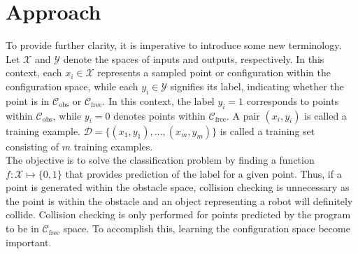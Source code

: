 \documentclass{ctuthesis}
\begin{document}
\section{Approach} 
To provide further clarity, 
it is imperative to introduce some new terminology. 
Let \( \mathcal{X} \) and \( \mathcal{Y} \) denote the spaces of inputs and outputs, 
respectively. 
In this context, 
each \( x_i \in \mathcal{X} \) represents a sampled point or configuration within the configuration space, 
while each \( y_i \in \mathcal{Y} \) signifies its label, 
indicating whether the point is in $\mathcal{C}_{\text{obs}}$ or $\mathcal{C}_{\text{free}}$. 
In this context, 
the label \( y_i = 1 \) corresponds to points within \( \mathcal{C}_{\text{obs}} \), 
while \( y_i = 0 \) denotes points within \( \mathcal{C}_{\text{free}} \).
A pair \( ( x_i, y_i) \) is called a training example. 
\( \mathcal{D} = \{(x_1, y_1), \ldots , (x_m, y_m)\} \) is called a training set 
consisting of \( m \) training examples.
\\[12pt]
The objective is to solve the classification problem by 
finding a function \( f: \mathcal{X} \mapsto \{0,1\} \) that provides 
prediction of the label for a given point.
Thus, if a point is generated within the obstacle space, 
collision checking is unnecessary as the point is within the obstacle 
and an object representing a robot will definitely collide. 
Collision checking is only performed for points predicted by the program 
to be in $\mathcal{C}_{\text{free}}$ space.
To accomplish this, 
learning the configuration space become important. 
\end{document}
